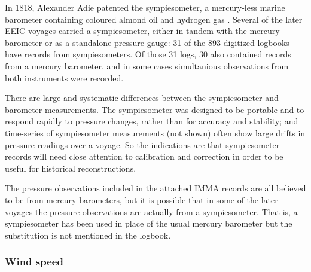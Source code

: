 \documentclass[CP]{copernicus}
\begin{document}
 In 1818, Alexander Adie patented the sympiesometer, a mercury-less marine barometer containing coloured almond oil and hydrogen gas \citep{middleton64}. Several of the later EEIC voyages carried a sympiesometer, either in tandem with the mercury barometer or as a standalone pressure gauge: 31 of the 893 digitized logbooks have records from sympiesometers. Of those 31 logs, 30 also contained records from a mercury barometer, and in some cases simultanious observations from both instruments were recorded.

There are large and systematic differences between the sympiesometer and barometer measurements. The sympiesometer was designed to be portable and to respond rapidly to pressure changes, rather than for accuracy and stability; and time-series of sympiesometer measurements (not shown) often show large drifts in pressure readings over a voyage. So the indications are that sympiesometer records will need close attention to calibration and correction in order to be useful for historical reconstructions.

The pressure observations included in the attached IMMA records are all believed to be from mercury barometers, but it is possible that in some of the later voyages the pressure observations are actually from a sympiesometer. That is, a sympiesometer has been used in place of the usual mercury barometer but the substitution is not mentioned in the logbook.

\subsubsection{Wind speed}
\label{Swind}
\end{document}

